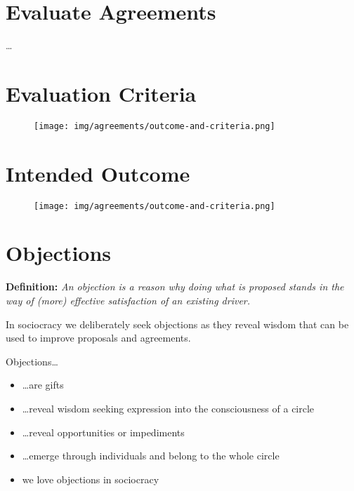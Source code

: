 \section{Evaluate Agreements}
\label{evaluateagreements}

{\ldots}

\section{Evaluation Criteria}
\label{evaluationcriteria}

\begin{figure}[htbp]
\centering
\texttt{[image: img/agreements/outcome-and-criteria.png]}
\end{figure}

\section{Intended Outcome}
\label{intendedoutcome}

\begin{figure}[htbp]
\centering
\texttt{[image: img/agreements/outcome-and-criteria.png]}
\end{figure}

\section{Objections}
\label{objections}

\textbf{Definition:} \emph{An objection is a reason why doing what is proposed stands in the way of (more) effective satisfaction of an existing driver.}

In sociocracy we deliberately seek objections as they reveal
wisdom that can be used to improve proposals and agreements.

Objections{\ldots}

\begin{itemize}
\item {\ldots}are gifts

\item {\ldots}reveal wisdom seeking expression into the consciousness of a circle

\item {\ldots}reveal opportunities or impediments

\item {\ldots}emerge through individuals and belong to the whole circle

\item we love objections in sociocracy

\end{itemize}

